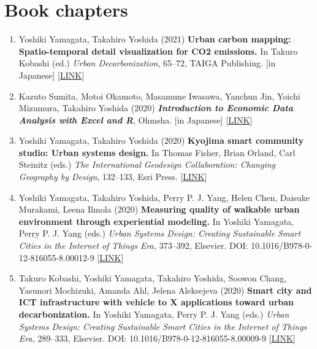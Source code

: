 \documentclass[]{book}
\providecommand{\tightlist}{%
  \setlength{\itemsep}{0pt}\setlength{\parskip}{0pt}}
\begin{document}
\hypertarget{book-chapters}{%
\section*{Book chapters}\label{book-chapters}}

\begin{enumerate}
\def\labelenumi{\arabic{enumi}.}
\tightlist
\item
  Yoshiki Yamagata, Takahiro Yoshida (2021)
  \textbf{Urban carbon mapping: Spatio-temporal detail visualization for CO2 emissions.}
  In Takuro Kobashi (ed.)
  \emph{Urban Decarbonization}, 65--72, TAIGA Publishing.
  {[}in Japanese{]} {[}\href{https://www.taigashuppan.co.jp/products/detail/552}{LINK}{]}
\item
  Kazuto Sumita, Motoi Okamoto, Masamune Iwasawa, Yanchun Jin, Yoichi Mizumura, Takahiro Yoshida (2020)
  \textbf{\emph{Introduction to Economic Data Analysis with Excel and R}}, Ohmsha.
  {[}in Japanese{]} {[}\href{https://www.ohmsha.co.jp/book/9784274225628/}{LINK}{]}
\item
  Yoshiki Yamagata, Takahiro Yoshida (2020)
  \textbf{Kyojima smart community studio: Urban systems design.}
  In Thomas Fisher, Brian Orland, Carl Steinitz (eds.)
  \emph{The International Geodesign Collaboration: Changing Geography by Design}, 132--133, Esri Press.
  {[}\href{https://esripress.esri.com/display/index.cfm?fuseaction=display\&websiteID=388\&moduleID=0}{LINK}{]}
\item
  Yoshiki Yamagata, Takahiro Yoshida, Perry P. J. Yang, Helen Chen, Daisuke Murakami, Leena Ilmola (2020)
  \textbf{Measuring quality of walkable urban environment through experiential modeling.}
  In Yoshiki Yamagata, Perry P. J. Yang (eds.)
  \emph{Urban Systems Design: Creating Sustainable Smart Cities in the Internet of Things Era,} 373--392, Elsevier.
  DOI: 10.1016/B978-0-12-816055-8.00012-9 {[}\href{https://www.elsevier.com/books/urban-systems-design/yamagata/978-0-12-816055-8}{LINK}{]}
\item
  Takuro Kobashi, Yoshiki Yamagata, Takahiro Yoshida, Soowon Chang, Yasunori Mochizuki, Amanda Ahl, Jelena Aleksejeva (2020)
  \textbf{Smart city and ICT infrastructure with vehicle to X applications toward urban decarbonization.}
  In Yoshiki Yamagata, Perry P. J. Yang (eds.)
  \emph{Urban Systems Design: Creating Sustainable Smart Cities in the Internet of Things Era,} 289--333, Elsevier.
  DOI: 10.1016/B978-0-12-816055-8.00009-9 {[}\href{https://www.elsevier.com/books/urban-systems-design/yamagata/978-0-12-816055-8}{LINK}{]}

\end{enumerate}
\end{document}
